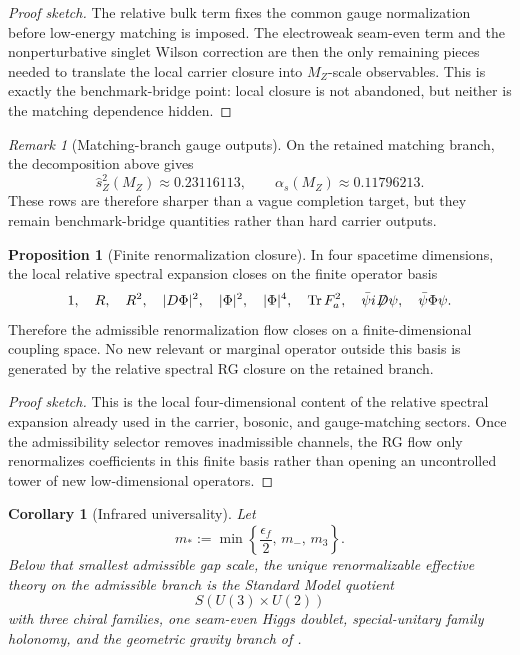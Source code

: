 \documentclass[11pt,a4paper]{article}
\newtheorem{corollary}[theorem]{Corollary}
\theoremstyle{definition}
\newtheorem{proposition}[theorem]{Proposition}
\theoremstyle{remark}
\newtheorem*{remark}{Remark}
\DeclareMathOperator{\tr}{Tr}
\begin{document}
\begin{proof}[Proof sketch]
The relative bulk term fixes the common gauge normalization before low-energy matching is imposed. The electroweak seam-even term and the nonperturbative singlet Wilson correction are then the only remaining pieces needed to translate the local carrier closure into $M_Z$-scale observables. This is exactly the benchmark-bridge point: local closure is not abandoned, but neither is the matching dependence hidden.
\end{proof}

\begin{remark}[Matching-branch gauge outputs]
On the retained matching branch, the decomposition above gives
\[
\hat s_Z^2(M_Z)\approx \num{0.23116113},
\qquad
\alpha_s(M_Z)\approx \num{0.11796213}.
\]
These rows are therefore sharper than a vague completion target, but they remain benchmark-bridge quantities rather than hard carrier outputs.
\end{remark}

\begin{proposition}[Finite renormalization closure]
In four spacetime dimensions, the local relative spectral expansion closes on the finite operator basis
\[
1,\quad
R,\quad
R^2,\quad
|D\Phi|^2,\quad
|\Phi|^2,\quad
|\Phi|^4,\quad
\tr F_a^2,\quad
\bar\psi i\!\not\!\!D\psi,\quad
\bar\psi\Phi\psi.
\]
Therefore the admissible renormalization flow closes on a finite-dimensional coupling space. No new relevant or marginal operator outside this basis is generated by the relative spectral RG closure on the retained branch.
\end{proposition}

\begin{proof}[Proof sketch]
This is the local four-dimensional content of the relative spectral expansion already used in the carrier, bosonic, and gauge-matching sectors. Once the admissibility selector removes inadmissible channels, the RG flow only renormalizes coefficients in this finite basis rather than opening an uncontrolled tower of new low-dimensional operators.
\end{proof}

\begin{corollary}[Infrared universality]
Let
\[
m_*:=\min\left\{\frac{\epsilon_f}{2},\,m_-,\,m_3\right\}.
\]
Below that smallest admissible gap scale, the unique renormalizable effective theory on the admissible branch is the Standard Model quotient
\[
S(U(3)\times U(2))
\]
with three chiral families, one seam-even Higgs doublet, special-unitary family holonomy, and the geometric gravity branch of .
\end{corollary}
\end{document}
